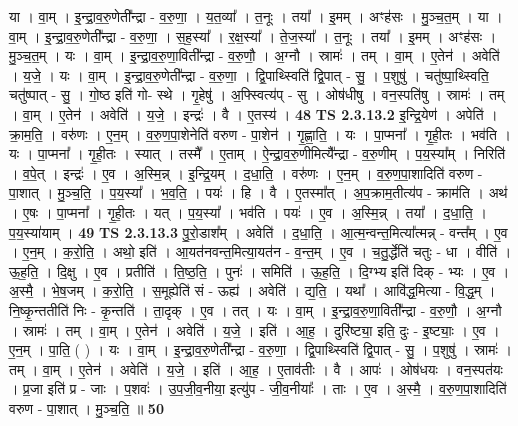 \documentclass[17pt]{extarticle}
\begin{document}
                  या । वा॒म् । इ॒न्द्रा॒व॒रु॒णेती᳚न्द्रा - व॒रु॒णा॒ । य॒त॒व्या᳚ । त॒नूः । तया᳚ । इ॒मम् । अꣳह॑सः । मु॒ञ्च॒त॒म् । या । वा॒म् । इ॒न्द्रा॒व॒रु॒णेती᳚न्द्रा - व॒रु॒णा॒ । स॒ह॒स्या᳚ । र॒क्ष॒स्या᳚ । ते॒ज॒स्या᳚ । त॒नूः । तया᳚ । इ॒मम् । अꣳह॑सः । मु॒ञ्च॒त॒म् ।  यः । वा॒म् । इ॒न्द्रा॒व॒रु॒णा॒विती᳚न्द्रा - व॒रु॒णौ॒ । अ॒ग्नौ । स्रामः॑ । तम् । वा॒म् । ए॒तेन॑ । अवेति॑ । य॒जे॒ । यः । वा॒म् । इ॒न्द्रा॒व॒रु॒णेती᳚न्द्रा - व॒रु॒णा॒ । द्वि॒पाथ्स्विति॑ द्वि॒पात् - सु॒ । प॒शुषु॑ । चतु॑ष्पा॒थ्स्विति॒ चतु॑ष्पात् - सु॒ । गो॒ष्ठ इति॑ गो- स्थे । गृ॒हेषु॑ । अ॒फ्स्वित्य॑प् - सु । ओष॑धीषु । वन॒स्पति॑षु । स्रामः॑ । तम् । वा॒म् । ए॒तेन॑ । अवेति॑ । य॒जे॒ । इन्द्रः॑ । वै । ए॒तस्य॑ । \textbf{  48} \newline
                  \newline
                                \textbf{ TS 2.3.13.2} \newline
                  इ॒न्द्रि॒येण॑ । अपेति॑ । क्रा॒म॒ति॒ । वरु॑णः । ए॒न॒म् । व॒रु॒ण॒पा॒शेनेति॑ वरुण - पा॒शेन॑ । गृ॒ह्णा॒ति॒ । यः । पा॒प्मना᳚ । गृ॒ही॒तः । भव॑ति । यः ।   पा॒प्मना᳚ । गृ॒ही॒तः । स्यात् । तस्मै᳚ । ए॒ताम् । ऐ॒न्द्रा॒व॒रु॒णीमित्यै᳚न्द्रा - व॒रु॒णीम् । प॒य॒स्या᳚म् । निरिति॑ । व॒पे॒त् । इन्द्रः॑ । ए॒व । अ॒स्मि॒न्न् । इ॒न्द्रि॒यम् । द॒धा॒ति॒ । वरु॑णः । ए॒न॒म् । व॒रु॒ण॒पा॒शादिति॑ वरुण - पा॒शात् । मु॒ञ्च॒ति॒ । प॒य॒स्या᳚ । भ॒व॒ति॒ । पयः॑ । हि । वै । ए॒तस्मा᳚त् । अ॒प॒क्राम॒तीत्य॑प - क्राम॑ति । अथ॑ । ए॒षः । पा॒प्मना᳚ । गृ॒ही॒तः । यत् । प॒य॒स्या᳚ । भव॑ति । पयः॑ । ए॒व । अ॒स्मि॒न्न् । तया᳚ । द॒धा॒ति॒ । प॒य॒स्या॑याम् । \textbf{  49} \newline
                  \newline
                                \textbf{ TS 2.3.13.3} \newline
                  पु॒रो॒डाश᳚म् । अवेति॑ । द॒धा॒ति॒ । आ॒त्म॒न्वन्त॒मित्या᳚त्मन्न् - वन्त᳚म् । ए॒व । ए॒न॒म् । क॒रो॒ति॒ । अथो॒ इति॑ । आ॒यत॑नवन्त॒मित्या॒यत॑न - व॒न्त॒म् । ए॒व । च॒तु॒र्द्धेति॑ चतुः - धा । वीति॑ । ऊ॒ह॒ति॒ । दि॒क्षु । ए॒व । प्रतीति॑ । ति॒ष्ठ॒ति॒ । पुनः॑ । समिति॑ । ऊ॒ह॒ति॒ । दि॒ग्भ्य इति॑ दिक् - भ्यः । ए॒व ।   अ॒स्मै॒ । भे॒ष॒जम् । क॒रो॒ति॒ । स॒मूह्येति॑ सं - ऊह्य॑ । अवेति॑ । द्य॒ति॒ । यथा᳚ । आवि॑द्ध॒मित्या - वि॒द्ध॒म् । नि॒ष्कृ॒न्ततीति॑ निः - कृ॒न्तति॑ । ता॒दृक् । ए॒व । तत् । यः । वा॒म् । इ॒न्द्रा॒व॒रु॒णा॒विती᳚न्द्रा - व॒रु॒णौ॒ । अ॒ग्नौ । स्रामः॑ । तम् । वा॒म् । ए॒तेन॑ । अवेति॑ । य॒जे॒ । इति॑ । आ॒ह॒ । दुरि॑ष्ट्या॒ इति॒ दुः - इ॒ष्ट्याः॒ । ए॒व । ए॒न॒म् । पा॒ति॒ ( ) । यः । वा॒म् । इ॒न्द्रा॒व॒रु॒णेती᳚न्द्रा - व॒रु॒णा॒ । द्वि॒पाथ्स्विति॑ द्वि॒पात् - सु॒ । प॒शुषु॑ । स्रामः॑ । तम् । वा॒म् ।  ए॒तेन॑ । अवेति॑ । य॒जे॒ । इति॑ । आ॒ह॒ । ए॒ताव॑तीः । वै । आपः॑ । ओष॑धयः । वन॒स्पत॑यः । प्र॒जा इति॑ प्र - जाः । प॒शवः॑ । उ॒प॒जी॒व॒नीया॒ इत्यु॑प - जी॒व॒नीयाः᳚ । ताः । ए॒व । अ॒स्मै॒ । व॒रु॒ण॒पा॒शादिति॑ वरुण - पा॒शात् । मु॒ञ्च॒ति॒ ॥ \textbf{  50} \newline
\end{document}
